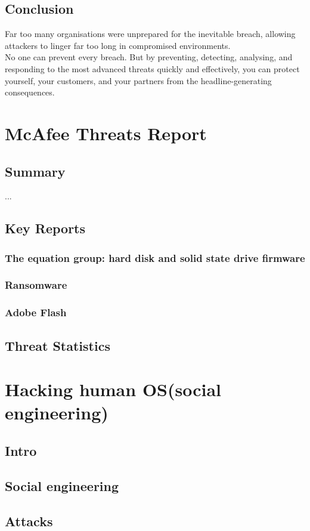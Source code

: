 \documentclass[10pt,a4paper]{report}
\begin{document}
\section{Conclusion}
Far too many organisations were unprepared for the inevitable breach, allowing attackers to linger far too long in compromised environments.\\
No one can prevent every breach. But by preventing, detecting, analysing, and responding to the most advanced threats quickly and effectively, you can protect yourself,
your customers, and your partners from the headline-generating consequences.
\chapter{McAfee Threats Report}
\section{Summary}...
\section{Key Reports}
\subsection{The equation group: hard disk and solid state drive firmware}
\subsection{Ransomware}
\subsection{Adobe Flash}
\section{Threat Statistics}
\chapter{Hacking human OS(social engineering)}
\section{Intro}
\section{Social engineering}
\section{Attacks}
\end{document}
